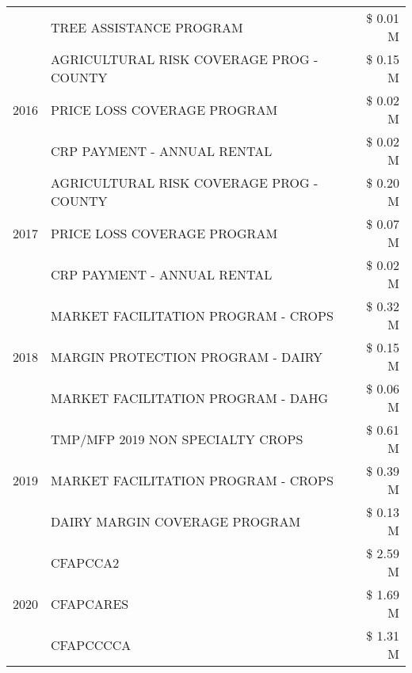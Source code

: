 \begin{tabular}{llr}
 & TREE ASSISTANCE PROGRAM & \$ 0.01 M \\
\cline{1-3}
\multirow[t]{3}{*}{2016} & AGRICULTURAL RISK COVERAGE PROG - COUNTY & \$ 0.15 M \\
 & PRICE LOSS COVERAGE PROGRAM & \$ 0.02 M \\
 & CRP PAYMENT - ANNUAL RENTAL & \$ 0.02 M \\
\cline{1-3}
\multirow[t]{3}{*}{2017} & AGRICULTURAL RISK COVERAGE PROG - COUNTY & \$ 0.20 M \\
 & PRICE LOSS COVERAGE PROGRAM & \$ 0.07 M \\
 & CRP PAYMENT - ANNUAL RENTAL & \$ 0.02 M \\
\cline{1-3}
\multirow[t]{3}{*}{2018} & MARKET FACILITATION PROGRAM - CROPS & \$ 0.32 M \\
 & MARGIN PROTECTION PROGRAM - DAIRY & \$ 0.15 M \\
 & MARKET FACILITATION PROGRAM - DAHG & \$ 0.06 M \\
\cline{1-3}
\multirow[t]{3}{*}{2019} & TMP/MFP 2019 NON SPECIALTY CROPS & \$ 0.61 M \\
 & MARKET FACILITATION PROGRAM - CROPS & \$ 0.39 M \\
 & DAIRY MARGIN COVERAGE PROGRAM & \$ 0.13 M \\
\cline{1-3}
\multirow[t]{3}{*}{2020} & CFAPCCA2 & \$ 2.59 M \\
 & CFAPCARES & \$ 1.69 M \\
 & CFAPCCCCA & \$ 1.31 M \\
\cline{1-3}
\bottomrule
\end{tabular}
